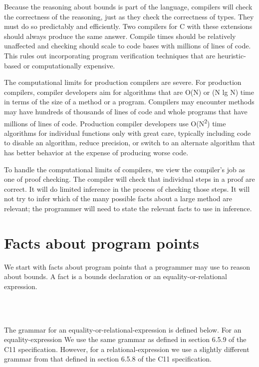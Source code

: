 Because the reasoning about bounds is part of the language, compilers
will check the correctness of the reasoning, just as they check the
correctness of types. They must do so predictably and efficiently. Two
compilers for C with these extensions should always produce the same
answer. Compile times should be relatively unaffected and checking
should scale to code bases with millions of lines of code. This rules
out incorporating program verification techniques that are
heuristic-based or computationally expensive.

The computational limits for production compilers are severe. For
production compilers, compiler developers aim for algorithms that are
O(N) or (N lg N) time in terms of the size of a method or a program.
Compilers may encounter methods may have hundreds of thousands of lines
of code and whole programs that have millions of lines of code.
Production compiler developers use O(N\textsuperscript{2}) time
algorithms for individual functions only with great care, typically
including code to disable an algorithm, reduce precision, or switch to
an alternate algorithm that has better behavior at the expense of
producing worse code.

To handle the computational limits of compilers, we view the compiler's
job as one of proof checking. The compiler will check that individual
steps in a proof are correct. It will do limited inference in the
process of checking those steps. It will not try to infer which of the
many possible facts about a large method are relevant; the programmer
will need to state the relevant facts to use in inference.

\section{Facts about program points}

We start with facts about program points that a programmer may use to reason
about bounds.  A fact is a bounds declaration or an equality-or-relational
expression.

\begin{tabbing}
\=\\
\> \\
\>
\end{tabbing}

The grammar for an equality-or-relational-expression is defined below. For an
equality-expression We use the same grammar as defined in section 6.5.9 of the
C11 specification. However, for a relational-expression we use a slightly
different grammar from that defined in section 6.5.8 of the C11 specification.

